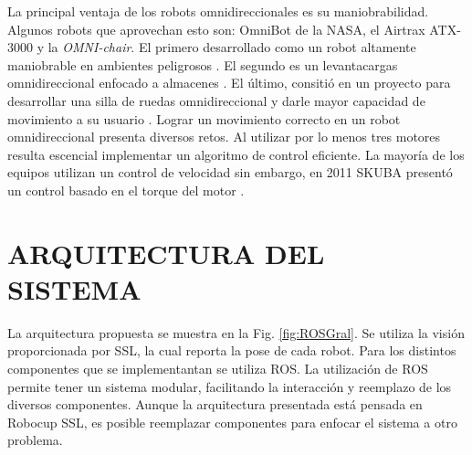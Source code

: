 \documentclass[twocolumn,10pt]{amrob}
\begin{document}
La principal ventaja de los robots omnidireccionales es su maniobrabilidad. Algunos robots que aprovechan esto son: OmniBot de la NASA, el Airtrax ATX-3000 y la \textit{OMNI-chair}. El primero desarrollado como un robot altamente maniobrable en ambientes peligrosos \cite{houshangi1999omnibot}. El segundo es un levantacargas omnidireccional enfocado a almacenes \cite{aduascualictei2011practical}. El último, consitió en un proyecto para desarrollar una silla de ruedas omnidireccional y darle mayor capacidad de movimiento a su usuario \cite{borgolte1998architectural}. 
Lograr un movimiento correcto en un robot omnidireccional presenta diversos retos. Al utilizar por lo menos tres motores resulta escencial implementar un algoritmo de control eficiente. La mayoría de los equipos utilizan un control de velocidad sin embargo, en 2011 SKUBA presentó un control basado en el torque del motor \cite{chaisoskuba}. %


\section*{ARQUITECTURA DEL SISTEMA}

La arquitectura propuesta se muestra en la Fig. \ref{fig:ROSGral}. Se utiliza la visión proporcionada por SSL, la cual reporta la pose de cada robot. Para los distintos componentes que se implementantan se utiliza ROS. La utilización de ROS permite tener un sistema modular, facilitando la interacción y reemplazo de los diversos componentes. Aunque la arquitectura presentada está pensada en Robocup SSL, es posible reemplazar componentes para enfocar el sistema a otro problema. \par
\end{document}
